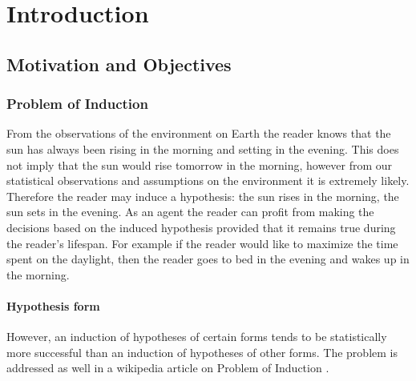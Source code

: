 
\chapter{Introduction}

\section{Motivation and Objectives}
\subsection{Problem of Induction}
From the observations of the environment on Earth the reader knows that the sun has always been rising in the morning and setting in the evening. This does not imply that the sun would rise tomorrow in the morning, however from our statistical observations and assumptions on the environment it is extremely likely. Therefore the reader may induce a hypothesis: the sun rises in the morning, the sun sets in the evening. As an agent the reader can profit from making the decisions based on the induced hypothesis provided that it remains true during the reader's lifespan. For example if the reader would like to maximize the time spent on the daylight, then the reader goes to bed in the evening and wakes up in the morning.

\subsubsection{Hypothesis form}

However, an induction of hypotheses of certain forms tends to be statistically more successful than an induction of hypotheses of other forms. The problem is addressed as well in a wikipedia article on Problem of Induction \cite{wikipediaProblemOfInduction}.

